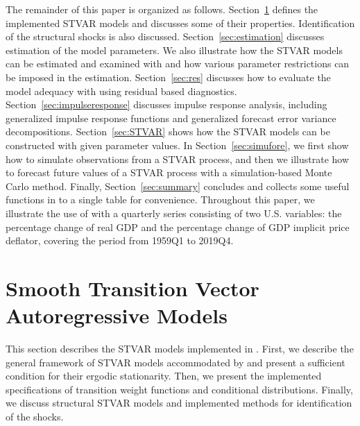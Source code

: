 \documentclass[nojss]{jss}
\begin{document}
The remainder of this paper is organized as follows. Section~\ref{sec:models} defines the implemented STVAR models and discusses some of their properties. Identification of the structural shocks is also discussed. Section~\ref{sec:estimation} discusses estimation of the model parameters. We also illustrate how the STVAR models can be estimated and examined with  and how various parameter restrictions can be imposed in the estimation. Section~\ref{sec:res} discusses how to evaluate the model adequacy with  using residual based diagnostics. Section~\ref{sec:impulseresponse} discusses impulse response analysis, including generalized impulse response functions and generalized forecast error variance decompositions. Section~\ref{sec:STVAR} shows how the STVAR models can be constructed with given parameter values. In Section~\ref{sec:simufore}, we first show how to simulate observations from a STVAR process, and then we illustrate how to forecast future values of a STVAR process with a simulation-based Monte Carlo method. Finally, Section~\ref{sec:summary} concludes and collects some useful functions in  to a single table for convenience. Throughout this paper, we illustrate the use of  with a quarterly series consisting of two U.S. variables: the percentage change of real GDP and the percentage change of GDP implicit price deflator, covering the period from 1959Q1 to 2019Q4.

\section{Smooth Transition Vector Autoregressive Models}\label{sec:models}
This section describes the STVAR models implemented in . First, we describe the general framework of STVAR models accommodated by  and present a sufficient condition for their ergodic stationarity. Then, we present the implemented specifications of transition weight functions and conditional distributions. Finally, we discuss structural STVAR models and implemented methods for identification of the shocks.
\end{document}
